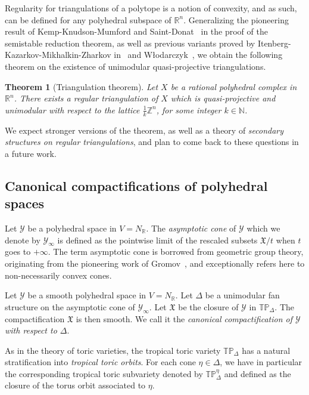 \documentclass[11pt]{amsart}
\newtheorem{thm}{Theorem}[section]
\theoremstyle{definition}
\numberwithin{equation}{section}
\renewcommand{\~}{\widetilde}
\newcommand{\Z}{\mathbb{Z}}
\newcommand{\R}{\mathbb{R}}
\newcommand{\TP}{\mathbb{TP}} %
\newcommand{\X}{\mathfrak X}
\newcommand{\Y}{\mathscr Y}
\begin{document}
\smallskip
Regularity for triangulations of a polytope is a notion of convexity, and as such, can be defined for any polyhedral subspace of $\R^n$. Generalizing the pioneering result of Kemp-Knudson-Mumford and Saint-Donat~\cite{KKMS} in the proof of the semistable reduction theorem, as well as previous variants proved by Itenberg-Kazarkov-Mikhalkin-Zharkov in~\cite{IKMZ} and W{\l}odarczyk~\cite{Wlo97}, we obtain the following theorem on the existence of unimodular  quasi-projective triangulations.

\begin{thm}[Triangulation theorem]\label{thm:regulartriangulations} Let $X$ be a rational polyhedral complex in $\R^n$. There exists a regular triangulation of $X$ which is quasi-projective and unimodular with respect to the lattice $\frac 1k \Z^n$, for some integer $k\in \mathbb N$.
\end{thm}

We expect stronger versions of the theorem, as well as a theory of \emph{secondary structures on regular triangulations}, and plan to come back to these questions in a future work.



\subsection{Canonical compactifications of polyhedral spaces}
Let $\Y$ be a polyhedral space in $V = N_\R$. The \emph{asymptotic cone} of $\Y$ which we denote by $\Y_\infty$ is defined as the pointwise limit of the rescaled subsets $\X/t$ when $t$ goes to $+\infty$. The term asymptotic cone is borrowed from geometric group theory, originating from the pioneering work of Gromov~\cites{Grom81, Grom83}, and exceptionally refers here to non-necessarily convex cones.

\medskip

Let $\Y$ be a smooth polyhedral space in $V = N_\R$. Let $\Delta$ be a unimodular fan structure on the asymptotic cone of $\Y_\infty$. Let $\X$ be the closure of $\Y$ in $\TP_\Delta$. The compactification $\X$ is then smooth. We call it the \emph{canonical compactification of $\Y$ with respect to $\Delta$}.

\smallskip
As in the theory of toric varieties, the tropical toric variety $\TP_\Delta$ has a natural stratification into  \emph{tropical toric orbits}. For each cone $\eta \in \Delta$, we have in particular the corresponding tropical toric subvariety denoted by $\TP_\Delta^\eta$ and defined as the closure of the torus orbit associated to $\eta$.
\end{document}

